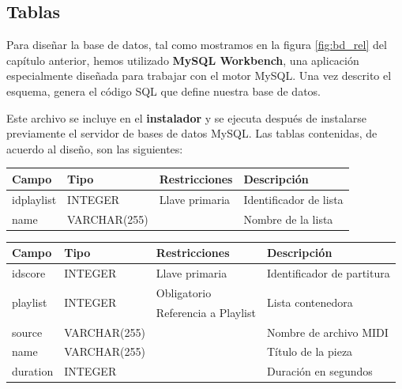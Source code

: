 \subsection{Tablas}

Para diseñar la base de datos, tal como mostramos en la figura \ref{fig:bd_rel} del capítulo anterior, hemos utilizado \textbf{MySQL Workbench}, una aplicación especialmente diseñada para trabajar con el motor MySQL. Una vez descrito el esquema, genera el código \acrshort{SQL} que define nuestra base de datos.

Este archivo se incluye en el \textbf{instalador} y se ejecuta después de instalarse previamente el servidor de bases de datos MySQL. Las tablas contenidas, de acuerdo al diseño, son las siguientes:

\smallskip

\begin{center}
	\begin{tabular}{|l|l|l|l|}
		\hline \textbf{Campo} & \textbf{Tipo} & \textbf{Restricciones} & \textbf{Descripción} \\ 
		\hline idplaylist & INTEGER & Llave primaria & Identificador de lista \\ 
		\hline name & VARCHAR(255) & & Nombre de la lista \\ 
		\hline 
	\end{tabular}
	\smallskip
\end{center}

\smallskip

\smallskip

\begin{center}
	\begin{tabular}{|l|l|l|l|}
		\hline \textbf{Campo} & \textbf{Tipo} & \textbf{Restricciones} & \textbf{Descripción} \\ 
		\hline idscore & INTEGER & Llave primaria & Identificador de partitura \\ 
		\hline \multirow{2}{*}{playlist} & \multirow{2}{*}{INTEGER} & Obligatorio & \multirow{2}{*}{Lista contenedora} \\
		\cline{3-3} & & Referencia a Playlist & \\
		\hline source & VARCHAR(255) & & Nombre de archivo MIDI \\
		\hline name & VARCHAR(255) & & Título de la pieza \\
		\hline duration & INTEGER & & Duración en segundos \\
		\hline 
	\end{tabular}
	\smallskip
\end{center}

